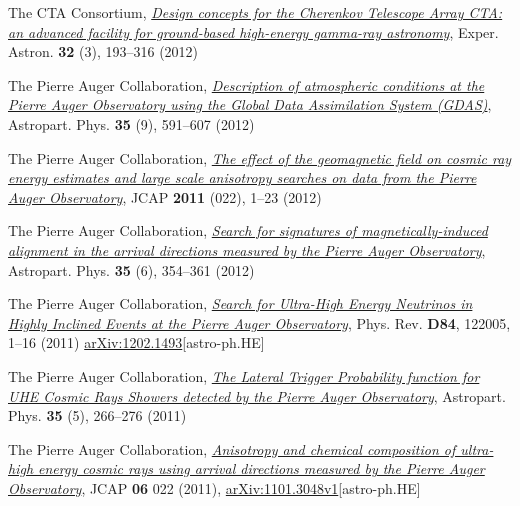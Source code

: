 \begin{etaremune}
\item {}The CTA Consortium,
\href{http://dx.doi.org/10.1007/s10686-011-9247-0}{\emph{Design concepts for
the Cherenkov Telescope Array CTA: an advanced facility for ground-based
high-energy gamma-ray astronomy}}, Exper. Astron. {\bf{32}} (3), 193--316
(2012)

\item {}The Pierre Auger Collaboration, 
\href{http://dx.doi.org/10.1016/j.astropartphys.2011.12.002}{\emph{Description
of atmospheric conditions at the Pierre Auger Observatory using the Global Data
Assimilation System (GDAS)}}, Astropart. Phys. {\bf{35}} (9), 591--607 (2012)

\item {}The Pierre Auger Collaboration, 
\href{http://dx.doi.org/10.1088/1475-7516/2011/11/022}{\emph{The effect of the
geomagnetic field on cosmic ray energy estimates and large scale anisotropy
searches on data from the Pierre Auger Observatory}}, JCAP {\bf{2011}} (022),
1--23 (2012)

\item {}The Pierre Auger Collaboration, 
\href{http://dx.doi.org/10.1016/j.astropartphys.2011.10.004}{\emph{Search for
signatures of magnetically-induced alignment in the arrival directions measured
by the Pierre Auger Observatory}}, Astropart. Phys. {\bf{35}} (6), 354--361
(2012)

\item {}The Pierre Auger Collaboration,
\href{http://dx.doi.org/10.1016/10.1103/PhysRevD.84.122005}{\emph{Search for
Ultra-High Energy Neutrinos in Highly Inclined Events at the Pierre Auger
Observatory}}, Phys.  Rev. {\bf D84}, 122005, 1--16 (2011)
\href{http://arxiv.org/abs/1202.1493}{arXiv:1202.1493}[astro-ph.HE]

\item {}The Pierre Auger Collaboration, 
\href{http://dx.doi.org/10.1016/j.astropartphys.2011.08.001}{\emph{The Lateral
Trigger Probability function for UHE Cosmic Rays Showers detected by the Pierre
Auger Observatory}}, Astropart. Phys. {\bf{35}} (5), 266--276 (2011)

\item {}The Pierre Auger Collaboration,
\href{http://dx.doi.org/10.1088/1475-7516/2011/06/022}{\emph{Anisotropy and
chemical composition of ultra-high energy cosmic rays using arrival directions
measured by the Pierre Auger Observatory}}, JCAP {\bf 06} 022 (2011),
\href{http://arxiv.org/abs/1106.3048}{arXiv:1101.3048v1}[astro-ph.HE]


\end{etaremune}
